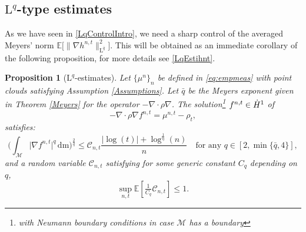 \documentclass[11pt,a4paper,oneside]{amsart}
\numberwithin{equation}{section}
\newtheorem{proposition}[theorem]{Proposition}
\newcommand{\dd}{\mathrm{d}}
\newcommand{\LL}{\mathrm{L}}
\newcommand{\m}{\mathrm{m}}
\begin{document}
\subsection{\texorpdfstring{$\LL^q$}{Lq}-type estimates}
%
As we have seen in \eqref{LqControlIntro}, we need a sharp control of the averaged Meyers' norm $\mathbb{E}\big[\|\nabla h^{n,t}\|^2_{\LL^{\bar q}}\big]$. This will be obtained as an immediate corollary of the following proposition, for more details see \eqref{LqEstihnt}.
%
\begin{proposition}[$\LL^{q}$-estimates]\label{prop1}
%
Let $\{\mu^n\}_n$ be defined in \eqref{eq:empmeas} with point clouds satisfying Assumption \ref{Assumptions}. Let $\bar q$ be the Meyers exponent given in Theorem \ref{Meyers} for the operator $-\nabla\cdot\rho\nabla$. The solution\footnote{with Neumann boundary conditions in case $\mathcal{M}$ has a boundary} $f^{n,t}\in {\rm \dot{H}^1}$ of 
%
\begin{equation}\label{eq:f^nt}
-\nabla\cdot \rho\nabla f^{n,t} =\mu^{n,t}-\rho_t,
\end{equation}
%
satisfies:
%
\begin{equation}\label{Eq22Bis}
\Big(\int_\mathcal{M} \vert\nabla f^{n,t}\vert^{q}\,\dd\m\Big)^\frac{2}{q}\leq \mathcal{C}_{n,t}\frac{\vert\log(t)\vert+\log^{\frac{1}{\eta}}(n)}{n}\quad \text{for any $q\in [2,\min\{\bar q,4\}]$},
\end{equation}
%
and a random variable $\mathcal{C}_{n,t}$ satisfying for some generic constant $C_q$ depending on $q$,
%
\begin{equation}\label{MomentBoundCn}
\sup_{n,t}\mathbb{E}[\tfrac{1}{C_{q}}\mathcal{C}_{n,t}]\leq 1.
\end{equation}
%

%
\medskip
%


\end{proposition}
\end{document}
